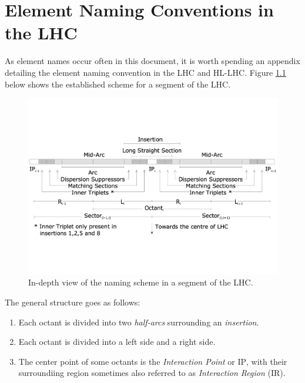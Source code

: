 \chapter{Element Naming Conventions in the LHC} %

\label{Appendix_Naming_Conventions} %


As element names occur often in this document, it is worth spending an appendix detailing the element naming convention in the LHC and HL-LHC.
Figure \ref{fig:lhc_segment_naming_scheme} below shows the established scheme for a segment of the LHC.

\begin{figure}[h]
    \centering
    \includegraphics*[width=0.99\columnwidth]{Figures/LHC_naming_scheme.pdf}
    \caption{In-depth view of the naming scheme in a segment of the LHC.}
    \label{fig:lhc_segment_naming_scheme}
  \end{figure}

The general structure goes as follows:
\begin{enumerate}
    \item Each octant is divided into two \textit{half-arcs} surrounding an \textit{insertion}.
    \item Each octant is divided into a left side and a right side.
    \item The center point of some octants is the \textit{Interaction Point} or $\mathrm{IP}$, with their surroundiing region sometimes also referred to as \textit{Interaction Region} ($\mathrm{IR}$).
\end{enumerate}

